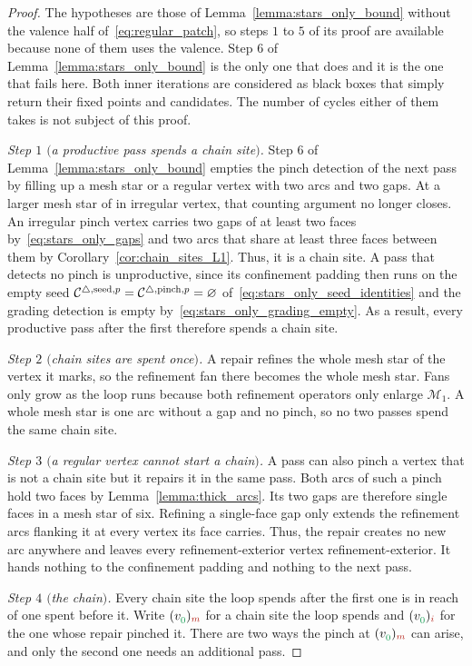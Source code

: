 \documentclass[a4paper, 12pt]{article}
\makeatletter
\DeclareRobustCommand{\candF}[1][]{\mathcal{C}^{\triangle\ifx\@empty#1\@empty\else,#1\fi}}
\newcommand{\green}{\color{ForestGreen}}
\newcommand{\brickred}{\color{BrickRed}}
\newcommand{\vertex}[2]{\freeQ{v}{}{#1}{#2}}
\newcommand{\coarseIdxone}{{\brickred i}}
\newcommand{\coarseIdxtwo}{{\brickred m}}
\newcommand{\lzero}{{\green 0}}
\newcommand{\freeQ}[4]{ ( {#1}^{#2}_{#3} )_{#4}}
\newcommand{\M}{\mathcal{M}}
\theoremstyle{definition}
\theoremstyle{plain}
\numberwithin{equation}{section}
\makeatother
\begin{document}
\begin{proof}
    The hypotheses are those of Lemma~\ref{lemma:stars_only_bound} without the valence half of~\eqref{eq:regular_patch}, so steps $1$ to $5$ of its proof are available because none of them uses the valence. Step $6$ of Lemma~\ref{lemma:stars_only_bound} is the only one that does and it is the one that fails here. Both inner iterations are considered as black boxes that simply return their fixed points and candidates. The number of cycles either of them takes is not subject of this proof.

    \emph{Step $1$ $($a productive pass spends a chain site$)$.} Step $6$ of Lemma~\ref{lemma:stars_only_bound} empties the pinch detection of the next pass by filling up a mesh star or a regular vertex with two arcs and two gaps. At a larger mesh star of in irregular vertex, that counting argument no longer closes. An irregular pinch vertex carries two gaps of at least two faces by~\eqref{eq:stars_only_gaps} and two arcs that share at least three faces between them by Corollary~\ref{cor:chain_sites_L1}. Thus, it is a chain site. A pass that detects no pinch is unproductive, since its confinement padding then runs on the empty seed $\candF[\mathrm{seed},p] = \candF[\mathrm{pinch},p] = \varnothing$ of~\eqref{eq:stars_only_seed_identities} and the grading detection is empty by~\eqref{eq:stars_only_grading_empty}. As a result, every productive pass after the first therefore spends a chain site.

    \emph{Step $2$ $($chain sites are spent once$)$.} A repair refines the whole mesh star of the vertex it marks, so the refinement fan there becomes the whole mesh star. Fans only grow as the loop runs because both refinement operators only enlarge $\M_1$. A whole mesh star is one arc without a gap and no pinch, so no two passes spend the same chain site.

    \emph{Step $3$ $($a regular vertex cannot start a chain$)$.} A pass can also pinch a vertex that is not a chain site but it repairs it in the same pass. Both arcs of such a pinch hold two faces by Lemma~\ref{lemma:thick_arcs}. Its two gaps are therefore single faces in a mesh star of six. Refining a single-face gap only extends the refinement arcs flanking it at every vertex its face carries. Thus, the repair creates no new arc anywhere and leaves every refinement-exterior vertex refinement-exterior. It hands nothing to the confinement padding and nothing to the next pass.

    \emph{Step $4$ $($the chain$)$.} Every chain site the loop spends after the first one is in reach of one spent before it. Write $\vertex{\lzero}{\coarseIdxtwo}$ for a chain site the loop spends and $\vertex{\lzero}{\coarseIdxone}$ for the one whose repair pinched it. There are two ways the pinch at $\vertex{\lzero}{\coarseIdxtwo}$ can arise, and only the second one needs an additional pass.


\end{proof}
\end{document}
